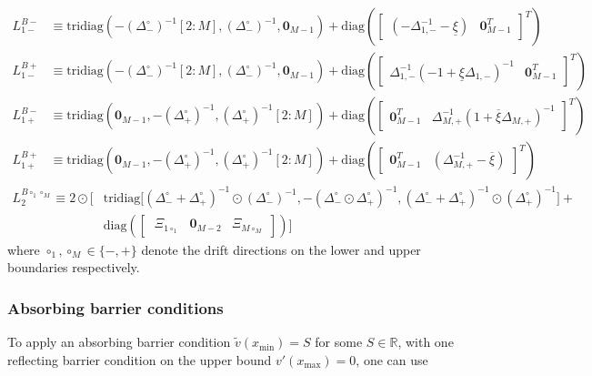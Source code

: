 \documentclass[11pt]{article}
\newcommand{\tridiag}{\ensuremath{\mathrm{tridiag}}}
\newcommand{\diag}{\ensuremath{\mathrm{diag}}}
\theoremstyle{definition}
\begin{document}
\begin{align}
{L}_{1-}^{B-} &\equiv
\tridiag \left(-(\Delta_-^\circ)^{-1}[2:M], (\Delta_-^\circ )^{-1}, \mathbf{0}_{M-1}  \right) +
\diag\left( 
\begin{bmatrix}
(-\Delta^{-1}_{1,-} - \underline{\xi} ) &
\mathbf{0}_{M-1}^T
\end{bmatrix}^T
\right) \\
{L}_{1-}^{B+} &\equiv
\tridiag \left(-(\Delta_-^\circ)^{-1}[2:M], (\Delta_-^\circ )^{-1}, \mathbf{0}_{M-1}  \right) +
\diag\left( 
\begin{bmatrix}
\Delta^{-1}_{1,-} (-1 + \underline{\xi} \Delta_{1,-})^{-1} &
\mathbf{0}_{M-1}^T
\end{bmatrix}^T
\right)
\end{align}
\begin{align}
{L}_{1+}^{B-} &\equiv
\tridiag \left(\mathbf{0}_{M-1}, -(\Delta_+^\circ )^{-1}, (\Delta_+^\circ)^{-1}[2:M]  \right) +
\diag\left( 
\begin{bmatrix}
\mathbf{0}_{M-1}^T &
\Delta^{-1}_{M,+} (1 + \overline{\xi} \Delta_{M,+})^{-1}
\end{bmatrix}^T
\right) \\
{L}_{1+}^{B+} &\equiv
\tridiag \left(\mathbf{0}_{M-1}, -(\Delta_+^\circ )^{-1}, (\Delta_+^\circ)^{-1}[2:M]  \right) +
\diag\left( 
\begin{bmatrix}
\mathbf{0}_{M-1}^T &
(\Delta^{-1}_{M,+} - \overline{\xi})
\end{bmatrix}^T
\right) 
\end{align}
\begin{align}
{L}_{2}^{B \circ_1 \circ_M } \equiv
2 \odot \Big[ & \text{tridiag} \Big[(\Delta_-^\circ + \Delta_+^\circ)^{-1} \odot (\Delta_{-}^\circ)^{-1}, 
-(\Delta_-^\circ \odot \Delta_+^\circ)^{-1},
(\Delta_-^\circ + \Delta_+^\circ)^{-1} \odot (\Delta_{+}^\circ)^{-1} \Big] + \\ & \diag\left(  
\begin{bmatrix} \
\Xi_{1 \circ_1} & \mathbf{0}_{M-2} & \Xi_{M \circ_M}
\end{bmatrix}
\right) \Big]
\end{align}
where $\circ_1, \circ_M \in \{-, +\}$ denote the drift directions on the lower and upper boundaries respectively.


\subsubsection{Absorbing barrier conditions}

To apply an absorbing barrier condition $\tilde{v}(x_{\min}) =S$ for some $S \in \mathbb{R}$, with one reflecting barrier condition on the upper bound $v'(x_{\max}) = 0$, one can use
\end{document}
